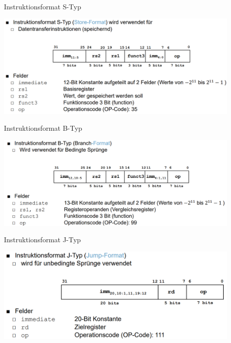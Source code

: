 \documentclass[
  german,            %
  aspectratio=169,    %
]{tumbeamer}
\begin{document}
\begin{frame}[c, fragile]{Instruktionsformat S-Typ}{}
	\begin{center}
		\includegraphics[width=0.9\textwidth]{w08_stype_lv.png}
	\end{center}
\end{frame}

\begin{frame}[c, fragile]{Instruktionsformat B-Typ}{}
	\begin{center}
		\includegraphics[width=0.9\textwidth]{w08_btype_lv.png}
	\end{center}
\end{frame}

\begin{frame}[c, fragile]{Instruktionsformat J-Typ}{}
	\begin{center}
		\includegraphics[width=0.9\textwidth]{w08_jtype_lv.png}
	\end{center}
\end{frame}
\end{document}
